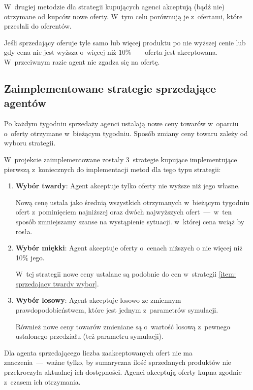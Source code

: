 \documentclass[12pt]{article}
\makeatletter
\def\namedlabel#1#2{\begingroup
   \def\@currentlabel{#2}%
   \label{#1}\endgroup
}
\makeatother
\begin{document}
W~drugiej metodzie dla strategii kupujących agenci akceptują (bądź nie) otrzymane od kupców nowe oferty. W~tym celu porównują je z~ofertami, które przesłali do oferentów. 

Jeśli sprzedający oferuje tyle samo
lub więcej produktu po nie wyższej cenie lub gdy cena nie jest wyższa o~więcej niż $10\%$~---~oferta jest akceptowana. W~przeciwnym razie agent nie zgadza się na ofertę.

\subsection{Zaimplementowane strategie sprzedające agentów}
Po każdym tygodniu sprzedaży agenci ustalają nowe ceny towarów w~oparciu o~oferty otrzymane w~bieżącym tygodniu. Sposób zmiany ceny towaru zależy od wyboru strategii.

W~projekcie zaimplementowane zostały 3~strategie kupujące implementujące pierwszą z~koniecznych do implementacji metod dla tego typu strategii:
\begin{enumerate}
 \item \namedlabel{item: sprzedajacy twardy wybor}{Wybór twardy} \textbf{Wybór twardy}: Agent akceptuje tylko oferty nie wyższe niż jego własne.

Nową cenę ustala jako średnią wszystkich otrzymanych w~bieżącym tygodniu ofert z~pominięciem najniższej oraz dwóch najwyższych ofert~---~w~ten sposób zmniejszamy szanse na wystąpienie sytuacji. w~której cena 
wciąż by rosła.
 \item \namedlabel{item: sprzedajacy miekki wybor}{Wybór miękki} \textbf{Wybór miękki}: Agent akceptuje oferty o~cenach niższych o nie więcej niż 10\% jego.

W~tej strategii nowe ceny ustalane są podobnie do cen w~strategii \ref{item: sprzedajacy twardy wybor}.

 \item \textbf{Wybór losowy}: Agent akceptuje losowo ze zmiennym prawdopodobieństwem, które jest jednym z~parametrów symulacji.

Również nowe ceny towarów zmieniane są o~wartość losową z~pewnego ustalonego przedziału (też parametru symulacji).
\end{enumerate}

Dla agenta sprzedającego liczba zaakceptowanych ofert nie ma znaczenia~---~ważne tylko, by sumaryczna ilość sprzedanych produktów nie przekroczyła aktualnej ich dostępności. Agenci akceptują oferty kupna
zgodnie z~czasem ich otrzymania.
\end{document}
